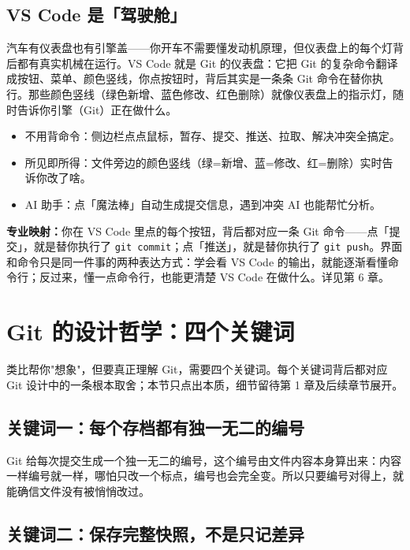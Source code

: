 \documentclass[12pt,a4paper,openany]{ctexbook}
\begin{document}
\subsection{VS Code 是「驾驶舱」}

汽车有仪表盘也有引擎盖——你开车不需要懂发动机原理，但仪表盘上的每个灯背后都有真实机械在运行。VS Code 就是 Git 的仪表盘：它把 Git 的复杂命令翻译成按钮、菜单、颜色竖线，你点按钮时，背后其实是一条条 Git 命令在替你执行。那些颜色竖线（绿色新增、蓝色修改、红色删除）就像仪表盘上的指示灯，随时告诉你引擎（Git）正在做什么。

\begin{itemize}[leftmargin=2em]
  \item 不用背命令：侧边栏点点鼠标，暂存、提交、推送、拉取、解决冲突全搞定。
  \item 所见即所得：文件旁边的颜色竖线（绿=新增、蓝=修改、红=删除）实时告诉你改了啥。
  \item AI 助手：点「魔法棒」自动生成提交信息，遇到冲突 AI 也能帮忙分析。
\end{itemize}

\medskip
\noindent\textbf{专业映射：}你在 VS Code 里点的每个按钮，背后都对应一条 Git 命令——点「提交」，就是替你执行了 \texttt{git commit}；点「推送」，就是替你执行了 \texttt{git push}。界面和命令只是同一件事的两种表达方式：学会看 VS Code 的输出，就能逐渐看懂命令行；反过来，懂一点命令行，也能更清楚 VS Code 在做什么。详见第 6 章。
\medskip

\section{Git 的设计哲学：四个关键词}

类比帮你"想象"，但要真正理解 Git，需要四个关键词。每个关键词背后都对应 Git 设计中的一条根本取舍；本节只点出本质，细节留待第 1 章及后续章节展开。

\subsection{关键词一：每个存档都有独一无二的编号}

Git 给每次提交生成一个独一无二的编号，这个编号由文件内容本身算出来：内容一样编号就一样，哪怕只改一个标点，编号也会完全变。所以只要编号对得上，就能确信文件没有被悄悄改过。

\subsection{关键词二：保存完整快照，不是只记差异}
\end{document}
